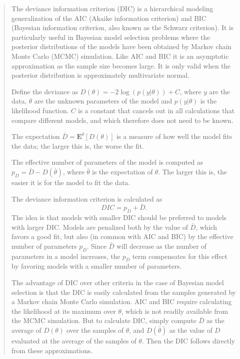 \begin{quote}
The deviance information criterion (DIC) is a hierarchical modeling
generalization of the AIC (Akaike information criterion) and BIC
(Bayesian information criterion, also known as the Schwarz
criterion). It is particularly useful in Bayesian model selection
problems where the posterior distributions of the models have been
obtained by Markov chain Monte Carlo (MCMC) simulation. Like AIC and
BIC it is an asymptotic approximation as the sample size becomes
large. It is only valid when the posterior distribution is
approximately multivariate normal.

Define the deviance as $D(\theta)=-2 \log(p(y|\theta))+C$, where $y$
are the data, $\theta$ are the unknown parameters of the model and
$p(y|\theta)$ is the likelihood function. $C$ is a constant that
cancels out in all calculations that compare different models, and
which therefore does not need to be known.

The expectation $\bar{D}=\mathbf{E}^\theta[D(\theta)]$ is a measure of
how well the model fits the data; the larger this is, the worse the
fit.

The effective number of parameters of the model is computed as
$p_D=\bar{D}-D(\bar{\theta})$, where $\bar{\theta}$ is the expectation of
$\theta$. The larger this is, the easier it is for the model to fit
the data.

The deviance information criterion is calculated as
\[
    \mathit{DIC} = p_D+\bar{D}.
\]
The idea is that models with smaller DIC should be preferred to models
with larger DIC. Models are penalized both by the value of $\bar{D}$,
which favors a good fit, but also (in common with AIC and BIC) by the
effective number of parameters $p_D$. Since $\bar D$ will decrease as
the number of parameters in a model increases, the $p_D$ term
compensates for this effect by favoring models with a smaller number
of parameters.

The advantage of DIC over other criteria in the case of Bayesian model
selection is that the DIC is easily calculated from the samples
generated by a Markov chain Monte Carlo simulation. AIC and BIC
require calculating the likelihood at its maximum over $\theta$, which
is not readily available from the MCMC simulation. But to calculate
DIC, simply compute $\bar{D}$ as the average of $D(\theta)$ over the
samples of $\theta$, and $D(\bar{\theta})$ as the value of $D$ evaluated
at the average of the samples of $\theta$. Then the DIC follows
directly from these approximations.
\end{quote}

